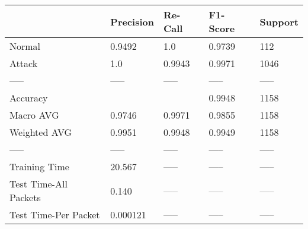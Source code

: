 \begin{tabular}{lllll}
\toprule
{} & Precision & Re-Call & F1-Score & Support \\
\midrule
Normal                &    0.9492 &     1.0 &   0.9739 &     112 \\
Attack                &       1.0 &  0.9943 &   0.9971 &    1046 \\
-----                 &     ----- &   ----- &    ----- &   ----- \\
Accuracy              &           &         &   0.9948 &    1158 \\
Macro AVG             &    0.9746 &  0.9971 &   0.9855 &    1158 \\
Weighted AVG          &    0.9951 &  0.9948 &   0.9949 &    1158 \\
-----                 &     ----- &   ----- &    ----- &   ----- \\
Training Time         &    20.567 &   ----- &    ----- &   ----- \\
Test Time-All Packets &     0.140 &   ----- &    ----- &   ----- \\
Test Time-Per Packet  &  0.000121 &   ----- &    ----- &   ----- \\
\bottomrule
\end{tabular}
